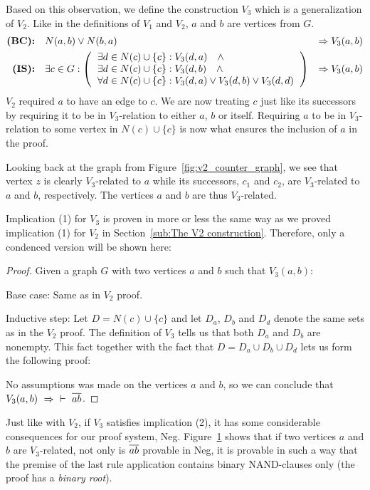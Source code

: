 Based on this observation, we define the construction $V_3$ which is a generalization of $V_2$.
Like in the definitions of $V_1$ and $V_2$, $a$ and $b$ are vertices from $G$.
\begin{align}
  \textbf{(BC):}&\quad N(a,b) \vee N(b,a) &\Rightarrow V_3(a,b)\label{eq:V2_BC}\\
  \textbf{(IS):}&\quad \exists c \in G:
  \left ( \begin{tabular}{l}
  $\exists d \in N(c) \cup \{ c \} : V_3(d,a) \quad \wedge$\\
  $\exists d \in N(c) \cup \{ c \} : V_3(d,b) \quad \wedge$\\
  $\forall d \in N(c) \cup \{ c \} : V_3(d,a) \vee V_3(d,b) \vee V_3(d,d)$
  \end{tabular} \right )
  &\Rightarrow V_3(a,b)\label{eq:V2_IS}
\end{align}
$V_2$ required $a$ to have an edge to $c$.
We are now treating $c$ just like its successors by requiring it to be in $V_3$-relation to either $a$, $b$ or itself.
Requiring $a$ to be in $V_3$-relation to some vertex in $N(c) \cup \{ c \}$ is now what ensures the inclusion of $a$ in the proof.

Looking back at the graph from Figure~\ref{fig:v2_counter_graph}, we see that vertex $z$ is clearly $V_3$-related to $a$ while its successors, $c_1$ and $c_2$, are $V_3$-related to $a$ and $b$, respectively.
The vertices $a$ and $b$ are thus $V_3$-related.

Implication (1) for $V_3$ is proven in more or less the same way as we proved implication (1) for $V_2$ in Section~\ref{sub:The V2 construction}.
Therefore, only a condenced version will be shown here:
\begin{proof}
  Given a graph $G$ with two vertices $a$ and $b$ such that $V_3(a,b)$:

  Base case: Same as in $V_2$ proof.

  Inductive step: Let $D = N(c) \cup \{ c \}$ and let $D_a$, $D_b$ and $D_d$ denote the same sets as in the $V_2$ proof.
  The definition of $V_3$ tells us that both $D_a$ and $D_b$ are nonempty.
  This fact together with the fact that $D = D_a \cup D_b \cup D_d$ lets us form the following proof:\par
  \begin{figure}[!h]
    \centering
    \begin{prooftree*}
    \end{prooftree*}
    \caption{}
    \label{fig:proof_v3}
  \end{figure}
  No assumptions was made on the vertices $a$ and $b$, so we can conclude that $V_3(a,b)~\Rightarrow~\;\vdash~\ol{ab}$.
\end{proof}
Just like with $V_2$, if $V_3$ satisfies implication (2), it has some considerable consequences for our proof system, Neg.
Figure~\ref{fig:proof_v3} shows that if two vertices $a$ and $b$ are $V_3$-related, not only is $\ol{ab}$ provable in Neg, it is provable in such a way that the premise of the last rule application contains binary NAND-clauses only (the proof has a \textit{binary root}).

